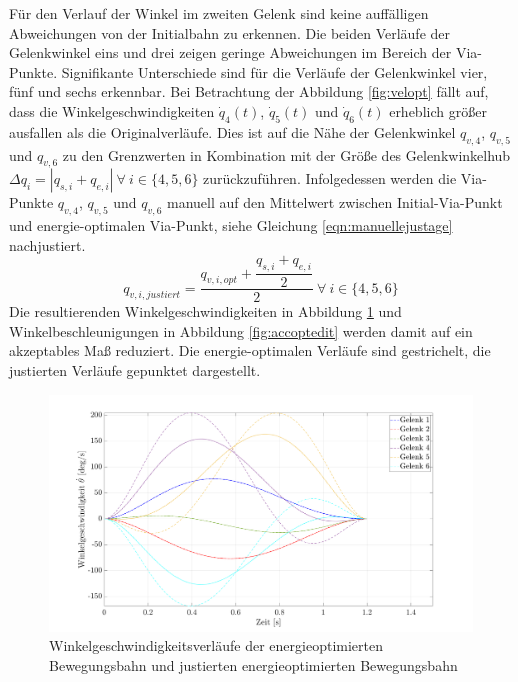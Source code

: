 %
Für den Verlauf der Winkel im zweiten Gelenk sind keine auffälligen Abweichungen von der Initialbahn zu erkennen. Die beiden Verläufe der Gelenkwinkel eins und drei zeigen geringe Abweichungen im Bereich der Via-Punkte. Signifikante Unterschiede sind für die Verläufe der Gelenkwinkel vier, fünf und sechs erkennbar.  Bei Betrachtung der Abbildung \ref{fig:velopt} fällt auf, dass die Winkelgeschwindigkeiten $\dot{q}_{4}(t)$, $\dot{q}_{5}(t)$ und $\dot{q}_{6}(t)$ erheblich größer ausfallen als die Originalverläufe. Dies ist auf die Nähe der Gelenkwinkel ${q}_{v,4}$, ${q}_{v,5}$ und ${q}_{v,6}$ zu den Grenzwerten in Kombination mit der Größe des Gelenkwinkelhub $\Delta q_i = | q_{s,i}+q_{e,i} | ~\forall~ i \in \{4,5,6\}$ zurückzuführen. Infolgedessen werden die Via-Punkte ${q}_{v,4}$, ${q}_{v,5}$ und ${q}_{v,6}$ manuell auf den Mittelwert zwischen Initial-Via-Punkt und energie-optimalen Via-Punkt, siehe Gleichung \ref{eqn:manuellejustage} nachjustiert.
%
\begin{equation}
	\label{eqn:manuellejustage}
	{q}_{v,i,justiert} = \dfrac{{q}_{v,i,opt} + \dfrac{q_{s,i}+q_{e,i}}{2}}{2}~\forall~ i \in \{4,5,6\}
\end{equation}
%
Die resultierenden Winkelgeschwindigkeiten in Abbildung \ref{fig:veloptedit} und Winkelbeschleunigungen in Abbildung \ref{fig:accoptedit}  werden damit auf ein akzeptables Maß reduziert. Die energie-optimalen Verläufe sind gestrichelt, die justierten Verläufe gepunktet dargestellt.
%
\begin{figure}[tbph]
	\centering
	\includegraphics[width=1\linewidth]{images/Optimierungsergebnisse_up/veloptedit}
	\caption{Winkelgeschwindigkeitsverläufe der energieoptimierten Bewegungsbahn und justierten energieoptimierten Bewegungsbahn}
	\label{fig:veloptedit}
\end{figure}
%

